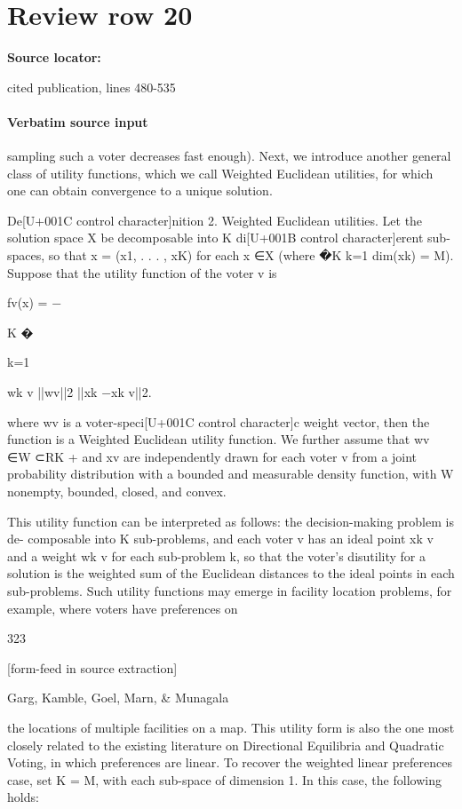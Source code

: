 \documentclass[10pt]{article}
\begin{document}
\section*{Review row 20}
\textbf{Source locator:} {\footnotesize\raggedright cited publication, lines 480-\allowbreak{}535\par}
\paragraph{Verbatim source input}
\begin{ReviewVerbatim}
sampling such a voter decreases fast enough).
Next, we introduce another general class of utility functions, which we call Weighted
Euclidean utilities, for which one can obtain convergence to a unique solution.

De[U+001C control character]nition 2. Weighted Euclidean utilities. Let the solution space X be decomposable
into K di[U+001B control character]erent sub-spaces, so that x = (x1, . . . , xK) for each x ∈X (where �K
k=1 dim(xk) =
M). Suppose that the utility function of the voter v is

fv(x) = −

K
�

k=1

wk
v
||wv||2
||xk −xk
v||2.

where wv is a voter-speci[U+001C control character]c weight vector, then the function is a Weighted Euclidean utility
function. We further assume that wv ∈W ⊂RK
+ and xv are independently drawn for each
voter v from a joint probability distribution with a bounded and measurable density function,
with W nonempty, bounded, closed, and convex.

This utility function can be interpreted as follows: the decision-making problem is de-
composable into K sub-problems, and each voter v has an ideal point xk
v and a weight wk
v
for each sub-problem k, so that the voter's disutility for a solution is the weighted sum of
the Euclidean distances to the ideal points in each sub-problems. Such utility functions
may emerge in facility location problems, for example, where voters have preferences on

323


[form-feed in source extraction]

Garg, Kamble, Goel, Marn, & Munagala

the locations of multiple facilities on a map. This utility form is also the one most closely
related to the existing literature on Directional Equilibria and Quadratic Voting, in which
preferences are linear. To recover the weighted linear preferences case, set K = M, with
each sub-space of dimension 1. In this case, the following holds:


\end{ReviewVerbatim}
\end{document}
